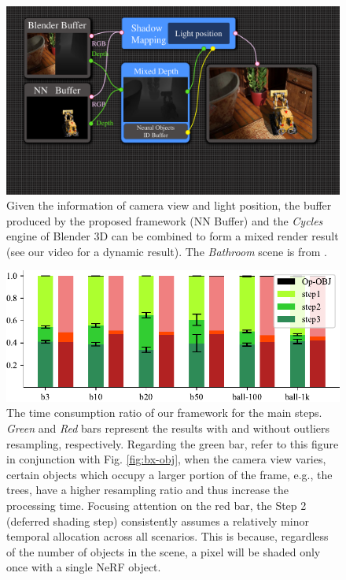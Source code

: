 \documentclass[letterpaper]{article}
\begin{document}
\begin{figure}[htbp]
    \centering
    \includegraphics[width=\linewidth]{figure/mixed_pipeline.pdf}
    \caption{Given the information of camera view and light position, the buffer produced by the proposed framework (NN Buffer) and the \textit{Cycles} engine of Blender 3D can be combined to form a mixed render result (see our video for a dynamic result). The \textit{Bathroom} scene is from \cite{huang2022hdr}.}
    \label{fig:mixed_pipeline}
\end{figure}

\begin{figure}[htbp]
    \centering
    \includegraphics[width=\linewidth]{figure/step_ratio_6.pdf}
    \caption{The time consumption ratio of our framework for the main steps. %
    \textit{Green} and \textit{Red} bars represent the results with and without outliers resampling, respectively. Regarding the green bar, refer to this figure in conjunction with Fig. \ref{fig:bx-obj}, when the camera view varies, certain objects which occupy a larger portion of the frame, e.g., the trees, have a higher resampling ratio and thus increase the processing time. Focusing attention on the red bar, the Step 2 (deferred shading step) consistently assumes a relatively minor temporal allocation across all scenarios. This is because, regardless of the number of objects in the scene, a pixel will be shaded only once with a single NeRF object.
    }
    \label{fig:step_ratio}
\end{figure}
\end{document}
